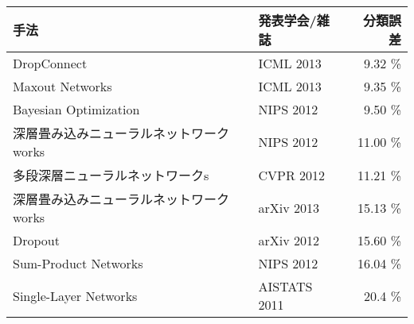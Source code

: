   \begin{tabular}{|l|l|r|}\hline
  手法 & 発表学会/雑誌 & 分類誤差 \\ \hline
DropConnect \cite{wan2013regularization}& ICML 2013 & 9.32 \% \\ \hline
Maxout Networks \cite{goodfellow2013maxout}& ICML 2013 & 9.35 \% \\ \hline
Bayesian Optimization \cite{snoek2012practical}& NIPS 2012 & 9.50 \% \\ \hline
深層畳み込みニューラルネットワークworks \cite{krizhevsky2012imagenet}& NIPS 2012 & 11.00 \% \\ \hline
多段深層ニューラルネットワークs \cite{ciresan2012multi-column}& CVPR 2012 & 11.21 \% \\ \hline
深層畳み込みニューラルネットワークworks \cite{zeiler2013stochastic}& arXiv 2013 & 15.13 \% \\ \hline
Dropout \cite{hinton2012improving}& arXiv 2012 & 15.60 \% \\ \hline
Sum-Product Networks \cite{gens2012discriminative}& NIPS 2012 & 16.04 \% \\ \hline
Single-Layer Networks \cite{coates2011an-analysis}& AISTATS 2011 & 20.4 \% \\ \hline
  \end{tabular}
